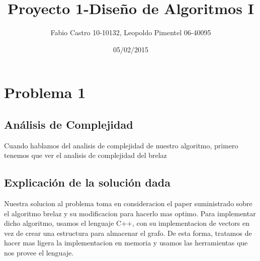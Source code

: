 \documentclass[a4paper,10pt]{article}
\title{}
\author{}
\date{}
\begin{document}
 
\title{\Huge Proyecto 1-Diseño de Algoritmos I}



\author{Fabio Castro 10-10132, Leopoldo Pimentel 06-40095} 



\date{05/02/2015}

\maketitle
\section{Problema 1}
\subsection{Análisis de Complejidad}
Cuando hablamos del analisis de complejidad de nuestro algoritmo, primero tenemos que ver el analisis de complejidad del brelaz
\subsection{Explicación de la solución dada}
\hspace{2cm}
Nuestra solucion al problema toma en consideracion el paper suministrado sobre el algoritmo brelaz y su modificacion para hacerlo mas optimo. 
Para implementar dicho algoritmo, usamos el lenguaje C++, con su implementacion de vectors en vez de crear una estructura para almacenar el grafo.
De esta forma, tratamos de hacer mas ligera la implementacion en memoria y usamos las herramientas que nos provee el lenguaje.
\end{document}
